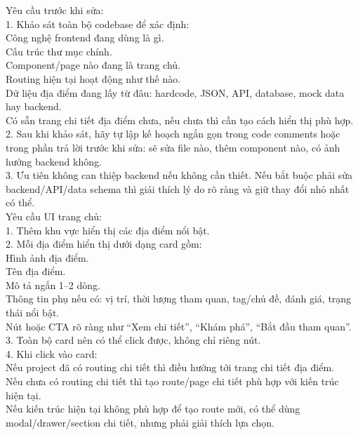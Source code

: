 \begin{enumerate}
Yêu cầu trước khi sửa: \\

1. Khảo sát toàn bộ codebase để xác định: \\
\* Công nghệ frontend đang dùng là gì. \\
\* Cấu trúc thư mục chính. \\
\* Component/page nào đang là trang chủ. \\
\* Routing hiện tại hoạt động như thế nào. \\
\* Dữ liệu địa điểm đang lấy từ đâu: hardcode, JSON, API, database, mock data hay backend. \\
\* Có sẵn trang chi tiết địa điểm chưa, nếu chưa thì cần tạo cách hiển thị phù hợp. \\

2. Sau khi khảo sát, hãy tự lập kế hoạch ngắn gọn trong code comments hoặc trong phần trả lời trước khi sửa: sẽ sửa file nào, thêm component nào, có ảnh hưởng backend không. \\
3. Ưu tiên không can thiệp backend nếu không cần thiết. Nếu bắt buộc phải sửa backend/API/data schema thì giải thích lý do rõ ràng và giữ thay đổi nhỏ nhất có thể. \\

Yêu cầu UI trang chủ: \\

1. Thêm khu vực hiển thị các địa điểm nổi bật. \\
2. Mỗi địa điểm hiển thị dưới dạng card gồm: \\
\* Hình ảnh địa điểm. \\
\* Tên địa điểm. \\
\* Mô tả ngắn 1–2 dòng. \\
\* Thông tin phụ nếu có: vị trí, thời lượng tham quan, tag/chủ đề, đánh giá, trạng thái nổi bật. \\
\* Nút hoặc CTA rõ ràng như “Xem chi tiết”, “Khám phá”, “Bắt đầu tham quan”. \\

3. Toàn bộ card nên có thể click được, không chỉ riêng nút. \\
4. Khi click vào card: \\
\* Nếu project đã có routing chi tiết thì điều hướng tới trang chi tiết địa điểm. \\
\* Nếu chưa có routing chi tiết thì tạo route/page chi tiết phù hợp với kiến trúc hiện tại. \\
\* Nếu kiến trúc hiện tại không phù hợp để tạo route mới, có thể dùng modal/drawer/section chi tiết, nhưng phải giải thích lựa chọn. \\


\end{enumerate}
